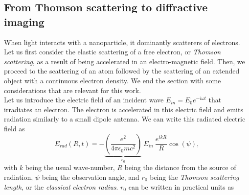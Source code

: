 \subsection{From Thomson scattering to diffractive imaging}\label{sec:saxs}
When light interacts with a nanoparticle, it dominantly scatterers of electrons. Let us first consider the elastic scattering of a free electron, or \textit{Thomson scattering}, as a result of being accelerated in an electro-magnetic field. Then, we proceed to the scattering of an atom followed by the scattering of an extended object with a continuous electron density. We end the section with some considerations that are relevant for this work.\\[1\baselineskip]
Let us introduce the electric field of an incident wave $E_{in}=E_{0}e^{-i\omega t}$ that irradiates an electron. The electron is accelerated in this electric field and emits radiation similarly to a small dipole antenna. We can write this radiated electric field as \citep{Als-Nielson-2011-JWS}
\begin{equation}
E_{rad}(R,t)=-\underbrace{\left(\frac{e^2}{4\pi \epsilon_0 m c^2}\right)}_{r_{0}}\ E_{in}\ \frac{e^{i k R}}{R} \cos\left(\psi\right),
\label{eq:radiated-by-electron}
\end{equation}
with $k$ being the usual wave-number, $R$ being the distance from the source of radiation, $\psi$ being the observation angle, and $r_0$ being the \textit{Thomson scattering length}, or the \textit{classical electron radius}. $r_0$ can be written in practical units as
